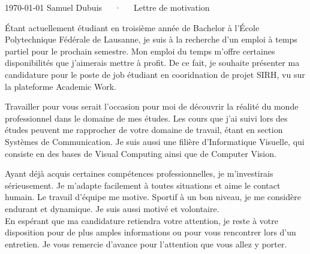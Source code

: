 \documentclass[12pt, a4paper]{awesome-cv}
\newcommand{\companyName}{vous }
\begin{document}
\makecvheader[C]

\makecvfooter
  {\today}
  {Samuel Dubuis~~~·~~~Lettre de motivation}
  {}

\makelettertitle

\begin{cvletter}

Étant actuellement étudiant en troisième année de Bachelor à l'École Polytechnique Fédérale de Lausanne, je suis à la recherche d'un emploi à temps partiel pour le prochain semestre. Mon emploi du temps m'offre certaines disponibilités que j'aimerais mettre à profit. De ce fait, je souhaite présenter ma candidature pour le poste de job étudiant en cooridnation de projet SIRH, vu sur la plateforme Academic Work.

\lettersection{Pourquoi \companyName?}
Travailler pour \companyName serait l'occasion pour moi de découvrir la réalité du monde professionnel dans le domaine de mes études. 
Les cours que j'ai suivi lors des études peuvent me rapprocher de votre domaine de travail, étant en section Systèmes de Communication.
Je suis aussi une filière d'Informatique Visuelle, qui consiste en des bases de Visual Computing ainsi que de Computer Vision.

Ayant déjà acquis certaines compétences professionnelles, je m’investirais sérieusement. Je m’adapte facilement à toutes situations et aime le contact humain. Le travail d’équipe me motive. Sportif à un bon niveau, je me considère endurant et dynamique. Je suis aussi motivé et volontaire.\\
En espérant que ma candidature retiendra votre attention, je reste à votre disposition pour de plus amples informations ou pour vous rencontrer lors d’un entretien. Je vous remercie d'avance pour l'attention que vous allez y porter.
\end{cvletter}


\makeletterclosing
\end{document}

